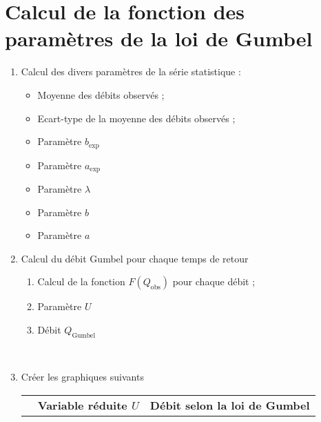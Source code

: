 \section{Calcul de la fonction des paramètres de la loi de Gumbel} \label{sec:loiGumbelTronquee}
\begin{enumerate}
    \item Calcul des divers paramètres de la série statistique :
    \begin{itemize}
        \item Moyenne des débits observés ; \\
        \item Ecart-type de la moyenne des débits observés ; \\
        \item Paramètre $b_\text{exp}$ 
        \item Paramètre $a_\text{exp}$ 
        \item Paramètre $\lambda$ 
        \item Paramètre $b$ 
        \item Paramètre $a$ 
    \end{itemize}
    \item Calcul du débit Gumbel pour chaque temps de retour
    \begin{enumerate}
        \item Calcul de la fonction $F(Q_\text{obs})$ pour chaque débit  ;
        \item Paramètre $U$ 
        \item Débit $Q_\text{Gumbel}$ 
    \end{enumerate}
     \\
    \bigskip
    \item Créer les graphiques suivants \\
    \begin{tabular}{p{3cm}|p{5cm}|p{5cm}}
        \toprule
                                    & \textbf{Variable réduite $U$} & \textbf{Débit selon la loi de Gumbel} \\

\end{tabular}
\end{enumerate}
